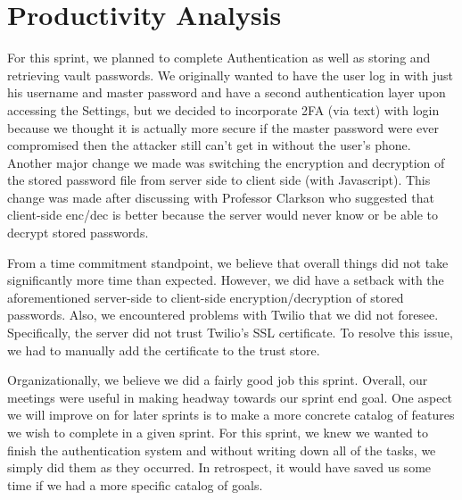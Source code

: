 \documentclass{article}
\begin{document}
\section{Productivity Analysis}
\par For this sprint, we planned to complete Authentication as well as storing and retrieving vault passwords. We originally wanted to have the user log in with just his username and master password and have a second authentication layer upon accessing the Settings, but we decided to incorporate 2FA (via text) with login because we thought it is actually more secure if the master password were ever compromised then the attacker still can't get in without the user's phone. Another major change we made was switching the encryption and decryption of the stored password file from server side to client side (with Javascript). This change was made after discussing with Professor Clarkson who suggested that client-side enc/dec is better because the server would never know or be able to decrypt stored passwords.

\par From a time commitment standpoint, we believe that overall things did not take significantly more time than expected. However, we did have a setback with the aforementioned server-side to client-side encryption/decryption of stored passwords. Also, we encountered problems with Twilio that we did not foresee. Specifically, the server did not trust Twilio's SSL certificate. To resolve this issue, we had to manually add the certificate to the trust store.

\par Organizationally, we believe we did a fairly good job this sprint. Overall, our meetings were useful in making headway towards our sprint end goal. One aspect we will improve on for later sprints is to make a more concrete catalog of features we wish to complete in a given sprint. For this sprint, we knew we wanted to finish the authentication system and without writing down all of the tasks, we simply did them as they occurred. In retrospect, it would have saved us some time if we had a more specific catalog of goals.
\end{document}
